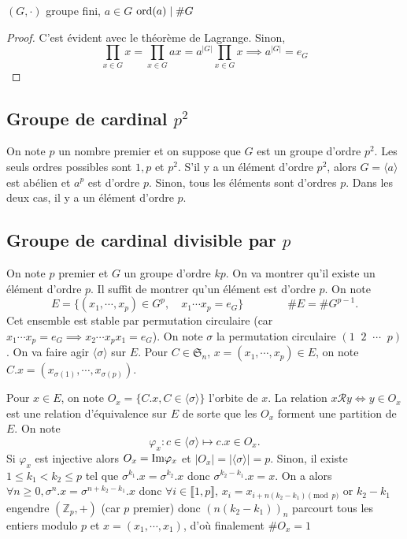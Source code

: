 \begin{prop}
    \Hyp $(G, \cdot)$ groupe fini, $a\in G$
    \Conc $\mathrm{ord}(a)\;|\;\# G$
\end{prop}

\begin{proof}
    C'est évident avec le théorème de Lagrange. Sinon, \[
        \prod_{x\in G}x=\prod_{x\in G}ax=a^{|G|}\prod_{x\in G}x \implies a^{|G|}=e_G
    \]
\end{proof}

\subsection{Groupe de cardinal $p^2$}

On note $p$ un nombre premier et on suppose que $G$ est un groupe d'ordre $p^2$. Les seuls ordres possibles sont $1, p$ et $p^2$. S'il y a un élément d'ordre $p^2$, alors $G=\langle a\rangle$ est abélien et $a^p$ est d'ordre $p$. Sinon, tous les éléments sont d'ordres $p$. Dans les deux cas, il y a un élément d'ordre $p$.

\subsection{Groupe de cardinal divisible par $p$}

On note $p$ premier et $G$ un groupe d'ordre $kp$. On va montrer qu'il existe un élément d'ordre $p$. Il suffit de montrer qu'un élément est d'ordre $p$. On note \[
    E=\{(x_1, \cdots, x_p)\in G^p, \quad x_1 \cdots x_p=e_G\}\qquad \qquad \#E=\#G^{p-1}.
\]
Cet ensemble est stable par permutation circulaire (car $x_1\cdots x_p=e_G \implies x_2\cdots x_px_1=e_G$). On note $\sigma$ la permutation circulaire $(1\;\; 2 \;\; \cdots \;\; p)$. On va faire agir $\langle \sigma \rangle$ sur $E$. Pour $C\in \mathfrak S_n$, $x=(x_1, \cdots, x_p)\in E$, on note $C.x=(x_{\sigma(1)}, \cdots, x_{\sigma(p)})$.

Pour $x\in E$, on note $O_x=\{C.x, C\in\langle \sigma\rangle\}$ l'orbite de $x$. La relation $x\mathcal Ry\iff y\in O_x$ est une relation d'équivalence sur $E$ de sorte que les $O_x$ forment une partition de $E$. On note \[
    \varphi_x:c\in \langle \sigma \rangle \longmapsto c.x\in O_x.
\]
Si $\varphi_x$ est injective alors $O_x=\mathrm{Im} \varphi_x$ et $|O_x|=|\langle \sigma \rangle|=p$. Sinon, il existe $1\leq k_1 < k_2\leq p$ tel que $\sigma^{k_1}.x=\sigma^{k_2}.x$ donc $\sigma^{k_2-k_1}.x=x$. On a alors $\forall n\geq 0, \sigma^n.x=\sigma^{n+k_2-k_1}.x$ donc $\forall i\in\llbracket 1, p\rrbracket$, $x_i=x_{i+n(k_2-k_1)\pmod p}$ or $k_2-k_1$ engendre $(\mathbb Z_p, +)$ (car $p$ premier) donc $(n(k_2-k_1))_n$ parcourt tous les entiers modulo $p$ et $x=(x_1, \cdots, x_1)$, d'où finalement $\#O_x=1$

